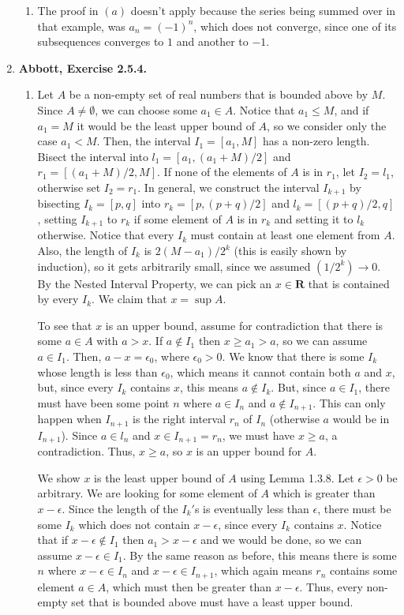 \documentclass{article}
\newcommand{\R}{\mathbf{R}}
\newcommand{\exc}[2][Abbott]{\item \textbf{#1, Exercise #2.}}
\newcommand{\lep}[1][L]{#1et $\epsilon > 0$ be arbitrary}
\begin{document}
\begin{enumerate}
\begin{enumerate}
        \item The proof in $(a)$ doesn't apply because the series being summed over in that example, was $a_n = (-1)^n$, which does not converge, since one of its subsequences converges to $1$ and another to $-1$.
    \end{enumerate}
    
    \exc{2.5.4}
    \begin{enumerate}
        \item Let $A$ be a non-empty set of real numbers that is bounded above by $M$. Since $A \neq \emptyset$, we can choose some $a_1 \in A$. Notice that $a_1 \leq M$, and if $a_1 = M$ it would be the least upper bound of $A$, so we consider only the case $a_1 < M$. Then, the interval $I_1 =[a_1, M]$ has a non-zero length. Bisect the interval into $l_1 = [a_1, (a_1+M)/2]$ and $r_1 = [(a_1+M)/2, M]$. If none of the elements of $A$ is in $r_1$, let $I_2 = l_1$, otherwise set $I_2 = r_1$. In general, we construct the interval $I_{k+1}$ by bisecting $I_k = [p, q]$ into $r_k=[p, (p+q)/2]$ and $l_k = [(p+q)/2, q]$, setting $I_{k+1}$ to $r_k$ if some element of $A$ is in $r_k$ and setting it to $l_k$ otherwise. Notice that every $I_k$ must contain at least one element from $A$. Also, the length of $I_k$ is $2 (M-a_1)/2^k$ (this is easily shown by induction), so it gets arbitrarily small, since we assumed $(1/2^k) \to 0$. By the Nested Interval Property, we can pick an $x \in \R$ that is contained by every $I_k$. We claim that $x = \sup A$.
        
        To see that $x$ is an upper bound, assume for contradiction that there is some $a \in A$ with $a > x$. If $a \notin I_1$ then $x \geq a_1 > a$, so we can assume $a \in I_1$. Then, $a-x = \epsilon_0$, where $\epsilon_0 > 0$. We know that there is some $I_k$ whose length is less than $\epsilon_0$, which means it cannot contain both $a$ and $x$, but, since every $I_k$ contains $x$, this means $a \notin I_k$. But, since $a \in I_1$, there must have been some point $n$ where $a \in I_n$ and $a \notin I_{n+1}$. This can only happen when $I_{n+1}$ is the right interval $r_n$ of $I_n$ (otherwise $a$ would be in $I_{n+1}$). Since $a \in l_n$ and $x \in I_{n+1} = r_n$, we must have $x \geq a$, a contradiction. Thus, $x \geq a$, so $x$ is an upper bound for $A$.
        
        We show $x$ is the least upper bound of $A$ using Lemma 1.3.8. \lep. We are looking for some element of $A$ which is greater than $x-\epsilon$. Since the length of the $I_k'$s is eventually less than $\epsilon$, there must be some $I_k$ which does not contain $x-\epsilon$, since every $I_k$ contains $x$. Notice that if $x-\epsilon \notin I_1$ then $a_1 > x-\epsilon$ and we would be done, so we can assume $x-\epsilon \in I_1$. By the same reason as before, this means there is some $n$ where $x-\epsilon \in I_n$ and $x-\epsilon \in I_{n+1}$, which again means $r_n$ contains some element $a \in A$, which must then be greater than $x-\epsilon$. Thus, every non-empty set that is bounded above must have a least upper bound.
        

\end{enumerate}
\end{enumerate}
\end{document}

